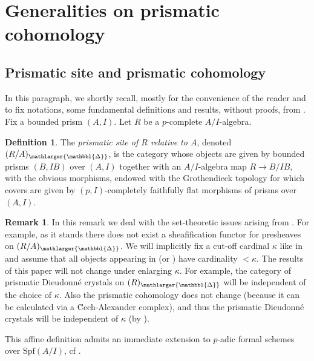 \documentclass{amsart}
\newcommand{\prism}{{\mathlarger{\mathbbl{\Delta}}}}
\theoremstyle{plain}
\theoremstyle{definition}
\newtheorem{definition}[theorem]{Definition}
\newtheorem{remark}[theorem]{Remark}
\begin{document}
\newpage

\section{Generalities on prismatic cohomology}
\label{sec:gener-prism-cohom}


\subsection{Prismatic site and prismatic cohomology}
\label{sec:prism-site-prism-cohom}

In this paragraph, we shortly recall, mostly for the convenience of the reader and to fix notations, some fundamental definitions and results, without proofs, from \cite{bhatt_scholze_prisms_and_prismatic_cohomology}. 
Fix a bounded prism $(A,I)$. Let $R$ be a $p$-complete $A/I$-algebra. 

\begin{definition}
\label{sec:prismatic-site}
The \textit{prismatic site of $R$ relative to $A$}, denoted $(R/A)_{\prism}$, is the category whose objects are given by bounded prisms $(B,IB)$ over $(A,I)$ together with an $A/I$-algebra map $R \to B/IB$, with the obvious morphisms, endowed with the Grothendieck topology for which covers are given by $(p,I)$-completely faithfully flat morphisms of prisms over $(A,I)$. 
\end{definition}

\begin{remark}
  \label{remark-set-theoretic-issues}
  In this remark we deal with the set-theoretic issues arising from . For example, as it stands there does not exist a sheafification functor for presheaves on $(R/A)_\prism$. We will implicitly fix a cut-off cardinal $\kappa$ like in \cite[Lemma 4.1]{scholze_etale_cohomology_of_diamonds} and assume that all objects appearing in  (or ) have cardinality $<\kappa$. The results of this paper will not change under enlarging $\kappa$. For example, the category of prismatic Dieudonn\'e crystals on $(R)_\prism$ will be independent of the choice of $\kappa$. Also the prismatic cohomology does not change (because it can be calculated via a \u{C}ech-Alexander complex), and thus the prismatic Dieudonn\'e crystals will be independent of $\kappa$ (by ).
\end{remark}

This affine definition admits an immediate extension to $p$-adic formal schemes over $\mathrm{Spf}(A/I)$, cf \cite{bhatt_scholze_prisms_and_prismatic_cohomology}. 
\end{document}
